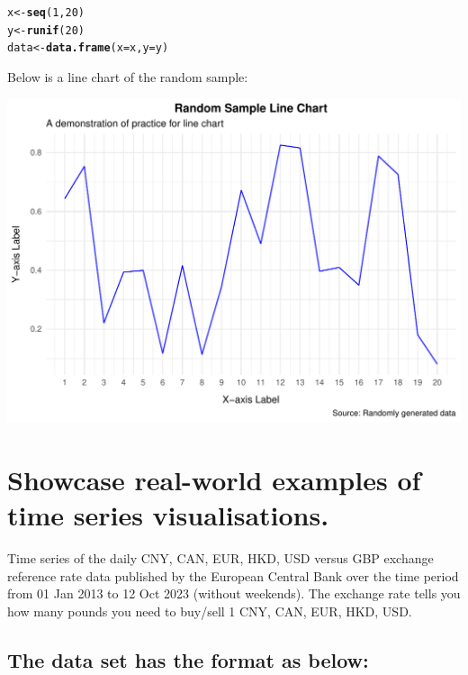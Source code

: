 \documentclass{article}\usepackage[]{graphicx}\usepackage[]{xcolor}
\makeatletter
\def\maxwidth{ %
  \ifdim\Gin@nat@width>\linewidth
    \linewidth
  \else
    \Gin@nat@width
  \fi
}
\newcommand{\hlnum}[1]{\textcolor[rgb]{0.686,0.059,0.569}{#1}}%
\newcommand{\hlstd}[1]{\textcolor[rgb]{0.345,0.345,0.345}{#1}}%
\newcommand{\hlkwb}[1]{\textcolor[rgb]{0.69,0.353,0.396}{#1}}%
\newcommand{\hlkwc}[1]{\textcolor[rgb]{0.333,0.667,0.333}{#1}}%
\newcommand{\hlkwd}[1]{\textcolor[rgb]{0.737,0.353,0.396}{\textbf{#1}}}%
\newenvironment{kframe}{%
 \def\at@end@of@kframe{}%
 \ifinner\ifhmode%
  \def\at@end@of@kframe{\end{minipage}}%
  \begin{minipage}{\columnwidth}%
 \fi\fi%
 \def\FrameCommand##1{\hskip\@totalleftmargin \hskip-\fboxsep
 \colorbox{shadecolor}{##1}\hskip-\fboxsep
     \hskip-\linewidth \hskip-\@totalleftmargin \hskip\columnwidth}%
 \MakeFramed {\advance\hsize-\width
   \@totalleftmargin\z@ \linewidth\hsize
   \@setminipage}}%
 {\par\unskip\endMakeFramed%
 \at@end@of@kframe}
\newenvironment{knitrout}{}{} %
\makeatother
\begin{document}
\begin{knitrout}
\color{fgcolor}\begin{kframe}
\begin{alltt}
\hlstd{x} \hlkwb{<-} \hlkwd{seq}\hlstd{(}\hlnum{1}\hlstd{,} \hlnum{20}\hlstd{)}
\hlstd{y} \hlkwb{<-} \hlkwd{runif}\hlstd{(}\hlnum{20}\hlstd{)}
\hlstd{data} \hlkwb{<-} \hlkwd{data.frame}\hlstd{(}\hlkwc{x} \hlstd{= x,} \hlkwc{y} \hlstd{= y)}
\end{alltt}
\end{kframe}
\end{knitrout}

Below is a line chart of the random sample:

\begin{knitrout}
\color{fgcolor}
\includegraphics[width=\maxwidth]{figure/plot-chunk-1} 
\end{knitrout}


\section*{Showcase real-world examples of time series visualisations.}

Time series of the daily CNY, CAN, EUR, HKD, USD versus GBP exchange reference rate data
published by the European Central Bank over the time period from 01 Jan 2013 to 12 Oct 2023 (without weekends). The exchange rate tells you how many pounds you need to buy/sell 1 CNY, CAN, EUR, HKD, USD.

\subsection{The data set has the format as below:}
\end{document}
